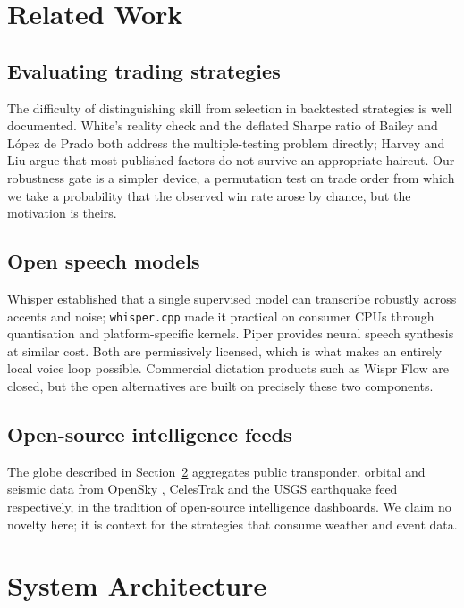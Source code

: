 \documentclass[conference]{IEEEtran}
\begin{document}
\section{Related Work}

\subsection{Evaluating trading strategies}
The difficulty of distinguishing skill from selection in backtested strategies
is well documented. White's reality check \cite{white2000} and the deflated
Sharpe ratio of Bailey and L\'{o}pez de Prado \cite{bailey2014} both address
the multiple-testing problem directly; Harvey and Liu \cite{harvey2016} argue
that most published factors do not survive an appropriate haircut. Our
robustness gate is a simpler device, a permutation test on trade order from
which we take a probability that the observed win rate arose by chance, but
the motivation is theirs.

\subsection{Open speech models}
Whisper \cite{radford2022} established that a single supervised model can
transcribe robustly across accents and noise; \texttt{whisper.cpp}
\cite{whispercpp} made it practical on consumer CPUs through quantisation and
platform-specific kernels. Piper \cite{piper} provides neural speech synthesis
at similar cost. Both are permissively licensed, which is what makes an
entirely local voice loop possible. Commercial dictation products such as
Wispr Flow are closed, but the open alternatives are built on precisely these
two components.

\subsection{Open-source intelligence feeds}
The globe described in Section~\ref{sec:arch} aggregates public transponder,
orbital and seismic data from OpenSky \cite{opensky}, CelesTrak
\cite{celestrak} and the USGS earthquake feed respectively, in the tradition
of open-source intelligence dashboards. We claim no novelty here; it is context
for the strategies that consume weather and event data.

\section{System Architecture}
\label{sec:arch}
\end{document}
